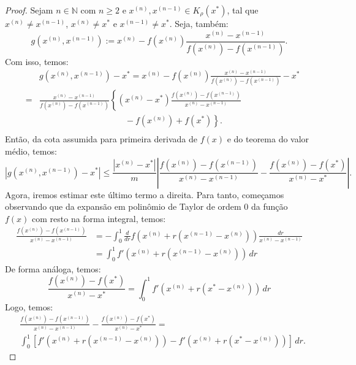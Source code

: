 \begin{proof}
  Sejam $n\in\mathbb{N}$ com $n\geq 2$ e $x^{(n)}, x^{(n-1)}\in K_\rho(x^*)$, tal que $x^{(n)}\neq x^{(n-1)}$, $x^{(n)}\neq x^*$ e $x^{(n-1)}\neq x^*$. Seja, também:
  \begin{equation}
    g(x^{(n)},x^{(n-1)}) := x^{(n)} - f(x^{(n)})\frac{x^{(n)} - x^{(n-1)}}{f(x^{(n)}) - f(x^{(n-1)})}.
  \end{equation}
Com isso, temos:
  \begin{eqnarray}
    &&g(x^{(n)},x^{(n-1)}) - x^* = x^{(n)} - f(x^{(n)})\frac{x^{(n)} - x^{(n-1)}}{f(x^{(n)}) - f(x^{(n-1)})} - x^*\\
    &=& \frac{x^{(n)} - x^{(n-1)}}{f(x^{(n)}) - f(x^{(n-1)})}\left\{(x^{(n)} - x^*)\frac{f(x^{(n)}) - f(x^{(n-1)})}{x^{(n)} - x^{(n-1)}}\right.\\ &\ &\qquad\qquad\qquad\qquad\qquad -\left. f(x^{(n)}) + f(x^*)\right\}.\\
  \end{eqnarray}
Então, da cota assumida para primeira derivada de $f(x)$ e do teorema do valor médio, temos:
\begin{equation}\label{eq:secantes-est0}
  |g(x^{(n)},x^{(n-1)}) - x^*| \leq \frac{|x^{(n)} - x^*|}{m}\left|\frac{f(x^{(n)}) - f(x^{(n-1)})}{x^{(n)} - x^{(n-1)}} - \frac{f(x^{(n)}) - f(x^*)}{x^{(n)} - x^*}\right|.
\end{equation}
Agora, iremos estimar este último termo a direita. Para tanto, começamos observando que da expansão em polinômio de Taylor de ordem $0$ da função $f(x)$ com resto na forma integral, temos:
\begin{eqnarray}
  \frac{f(x^{(n)}) - f(x^{(n-1)})}{x^{(n)} - x^{(n-1)}} &= -\int_0^1 \frac{d}{dr}f(x^{(n)} + r(x^{(n-1)} - x^{(n)}))\frac{dr}{x^{(n)} - x^{(n-1)}}\\
  &= \int_0^1 f'(x^{(n)} + r(x^{(n-1)} - x^{(n)}))\,dr
\end{eqnarray}
De forma análoga, temos:
\begin{equation}
  \frac{f(x^{(n)}) - f(x^*)}{x^{(n)} - x^*} = \int_0^1 f'(x^{(n)} + r(x^* - x^{(n)}))\,dr
\end{equation}
Logo, temos:
\begin{equation}\label{eq:secantes-0}
  \begin{split}
  &\frac{f(x^{(n)}) - f(x^{(n-1)})}{x^{(n)} - x^{(n-1)}} - \frac{f(x^{(n)}) - f(x^*)}{x^{(n)} - x^*} = \\
  &\int_0^1 \left[f'(x^{(n)} + r(x^{(n-1)} - x^{(n)})) - f'(x^{(n)} + r(x^* - x^{(n)}))\right]\,dr.
  \end{split}

\end{equation}
\end{proof}
